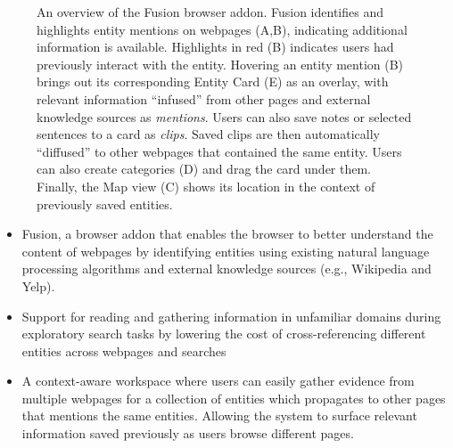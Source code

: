 \begin{figure}
    \centering
    \caption{An overview of the Fusion browser addon. Fusion identifies and highlights entity mentions on webpages (A,B), indicating additional information is available. Highlights in red (B) indicates users had previously interact with the entity. Hovering an entity mention (B) brings out its corresponding Entity Card (E) as an overlay, with relevant information ``infused'' from other pages and external knowledge sources as \emph{mentions}. Users can also save notes or selected sentences to a card as \emph{clips}. Saved clips are then automatically ``diffused'' to other webpages that contained the same entity. Users can also create categories (D) and drag the card under them. Finally, the Map view (C) shows its location in the context of previously saved entities.}
    \label{fig:main}
\end{figure}


\begin{itemize}
\item Fusion, a browser addon that enables the browser to better understand the content of webpages by identifying entities using existing natural language processing algorithms and external knowledge sources (e.g., Wikipedia and Yelp).
\item Support for reading and gathering information in unfamiliar domains during exploratory search tasks by lowering the cost of cross-referencing different entities across webpages and searches
\item A context-aware workspace where users can easily gather evidence from multiple webpages for a collection of entities which propagates to other pages that mentions the same entities. Allowing the system to surface relevant  information saved previously as users browse different pages.
\end{itemize}

